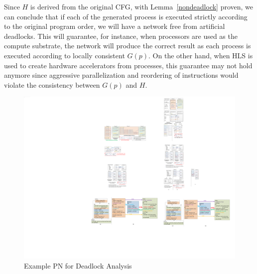 \documentclass{sig-alternate}
\begin{document}
Since $H$ is derived from the original CFG, with Lemma~\ref{nondeadlock} proven, we can conclude that if each of the generated process is executed strictly according to the original program order, we will have a network free from artificial deadlocks. This
will guarantee, for instance, when processors are used as the compute substrate, the network will produce the correct result as each process is executed according to locally consistent $G(p)$. On the other hand, when HLS is used to create hardware accelerators from processes, this guarantee may not
hold anymore since aggressive parallelization and reordering of instructions
would violate the consistency between $G(p)$ and $H$. 

\begin{figure}[htp]
\begin{center}
\includegraphics[width=1.0\linewidth]{fig/dlmo.pdf}
\caption{Example PN for Deadlock Analysis
\label{fig:example}}
\end{center}
\vspace{-2.0em}
\end{figure}
\end{document}
